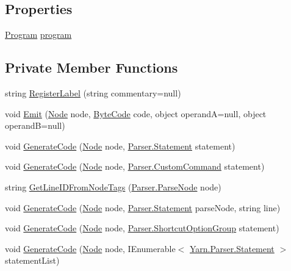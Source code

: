 \subsection*{Properties}
\begin{DoxyCompactItemize}
\item 
\hyperlink{a00124}{Program} \hyperlink{a00032_aa1737da428ec7d597009661dd8a47829}{program}
\end{DoxyCompactItemize}
\subsection*{Private Member Functions}
\begin{DoxyCompactItemize}
\item 
string \hyperlink{a00032_a1bae0d8b701a59708641aa36ea971fa5}{Register\-Label} (string commentary=null)
\item 
void \hyperlink{a00032_a774e8c143cdda0584fcfdda98626a83c}{Emit} (\hyperlink{a00029_da/de0/a00317}{Node} node, \hyperlink{a00029_ad5dfb6ee68ca7469623ad3e459f98894}{Byte\-Code} code, object operand\-A=null, object operand\-B=null)
\item 
void \hyperlink{a00032_a006f3becd521cc179ba3d3352f6f930b}{Generate\-Code} (\hyperlink{a00029_da/de0/a00317}{Node} node, \hyperlink{a00140}{Parser.\-Statement} statement)
\item 
void \hyperlink{a00032_a656b6c7fcd08d24300ec592465274f66}{Generate\-Code} (\hyperlink{a00029_da/de0/a00317}{Node} node, \hyperlink{a00061}{Parser.\-Custom\-Command} statement)
\item 
string \hyperlink{a00032_a5117b9c2253de15d3fd3557c8b037235}{Get\-Line\-I\-D\-From\-Node\-Tags} (\hyperlink{a00120}{Parser.\-Parse\-Node} node)
\item 
void \hyperlink{a00032_af1ee28d67902b27ee0816e2a47343652}{Generate\-Code} (\hyperlink{a00029_da/de0/a00317}{Node} node, \hyperlink{a00140}{Parser.\-Statement} parse\-Node, string line)
\item 
void \hyperlink{a00032_a3e492edcefdfeacec80e528f8c4fa6cc}{Generate\-Code} (\hyperlink{a00029_da/de0/a00317}{Node} node, \hyperlink{a00134}{Parser.\-Shortcut\-Option\-Group} statement)
\item 
void \hyperlink{a00032_ab4f6dd2ddf38b0c5bfb2b8a40869a09a}{Generate\-Code} (\hyperlink{a00029_da/de0/a00317}{Node} node, I\-Enumerable$<$ \hyperlink{a00140}{Yarn.\-Parser.\-Statement} $>$ statement\-List)
\item 

\end{DoxyCompactItemize}
